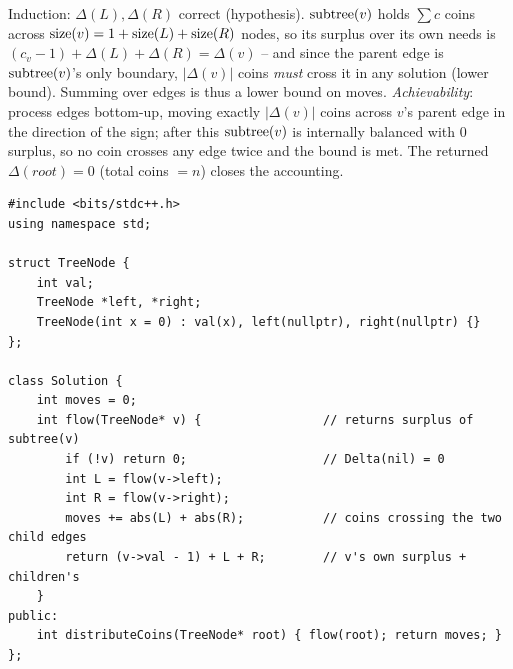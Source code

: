 \begin{proofbox}
Induction: $\Delta(L),\Delta(R)$ correct (hypothesis). $\operatorname{subtree}(v)$ holds
$\sum c$ coins across $\operatorname{size}(v)=1+\operatorname{size}(L)+\operatorname{size}(R)$ nodes, so its surplus over
its own needs is $(c_v-1)+\Delta(L)+\Delta(R)=\Delta(v)$ -- and since the parent
edge is $\operatorname{subtree}(v)$'s only boundary, $|\Delta(v)|$ coins \emph{must} cross it
in any solution (lower bound). Summing over edges is thus a lower bound on
moves. \emph{Achievability}: process edges bottom-up, moving exactly
$|\Delta(v)|$ coins across $v$'s parent edge in the direction of the sign; after
this $\operatorname{subtree}(v)$ is internally balanced with $0$ surplus, so no coin crosses
any edge twice and the bound is met. The returned $\Delta(\mathit{root})=0$
(total coins $=n$) closes the accounting.
\end{proofbox}

\begin{lstlisting}[caption={Distribute Coins (LeetCode 979) -- per-edge forced flow}, label={lst:c02-coins}]
#include <bits/stdc++.h>
using namespace std;

struct TreeNode {
    int val;
    TreeNode *left, *right;
    TreeNode(int x = 0) : val(x), left(nullptr), right(nullptr) {}
};

class Solution {
    int moves = 0;
    int flow(TreeNode* v) {                 // returns surplus of subtree(v)
        if (!v) return 0;                   // Delta(nil) = 0
        int L = flow(v->left);
        int R = flow(v->right);
        moves += abs(L) + abs(R);           // coins crossing the two child edges
        return (v->val - 1) + L + R;        // v's own surplus + children's
    }
public:
    int distributeCoins(TreeNode* root) { flow(root); return moves; }
};
\end{lstlisting}


